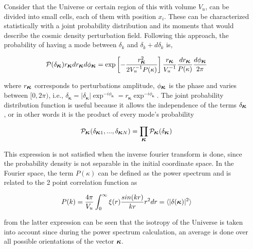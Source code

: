 Consider that the Universe or certain region of this with volume $V_u$, 
can be divided into small cells, each of them with position 
$x_i$. These can be characterized statistically with a joint probability 
distribution and its moments that would describe the 
cosmic density perturbation field. 
Following this approach, the probability of having a mode between $\delta_k$ and 
$\delta_{k}+d\delta_k$ is, 

\begin{equation}
\mathcal{P}(\delta_{\mbox{\boldmath$\kappa$}})r_{\mbox{\boldmath$\kappa$}}dr_{\mbox{\boldmath$\kappa$}}d\phi_{\mbox{\boldmath$\kappa$}}
=
\exp\left[-\frac{r_{\mbox{\boldmath$\kappa$}}^2}{2V_u^{-1}P(\kappa)}\right]	\frac{r_{\mbox{\boldmath$\kappa$}}}{V_u^{-1}}
\frac{dr_{\mbox{\boldmath$\kappa$}}}{P(\kappa)}\frac{d\phi_{\mbox{\boldmath$\kappa$}}}{2\pi}
\label{probabilidad}
\end{equation}


where $r_{\mbox{\boldmath$\kappa$}}$ corresponds to perturbations amplitude,  $\phi_{\mbox{\boldmath$\kappa$}}$ 
is the phase and varies between $[0,2\pi)$, i.e., $\delta_{\bm{\kappa}}=|\delta_{\bm{\kappa}}|\exp^{-i\phi_{\bm{\kappa}}} = r_{\bm{\kappa}} \exp^{-i\phi_{\bm\kappa}}$. The joint probability distribution function is useful because it allows the independence of the terms $\delta_{\mbox{\boldmath$\kappa$}}$, 
or in other words it is the product of every mode's probability

\[
\mathcal{P}_{\mbox{\boldmath$\kappa$}}(\delta_{\mbox{\boldmath$\kappa$}1},...,\delta_{\mbox{\boldmath$\kappa$}N})=
\prod_{\mbox{\boldmath$\kappa$}}\mathcal{P}_{\mbox{\boldmath$\kappa$}}(\delta_{\mbox{\boldmath$\kappa$}})
\]


This expression is not satisfied when the inverse fourier transform is done, since the 
probability density is not separable in the initial coordinate space. In the Fourier space,
the term $P(\kappa)$ can be defined as the power spectrum and is related to the 2 point correlation function as

\begin{equation}
P(k) = \frac{4\pi}{V_u}\int_0^\infty \xi (r)\frac{sin(kr)}{kr}r^2dr =  \langle|\delta(\mbox{\boldmath$\kappa$})|^2\rangle
\label{pk}
\end{equation}

from the latter expression can be seen that the isotropy of the Universe is taken into account since during the power spectrum calculation, an average is done over all  possible orientations of the vector ${\mbox{\boldmath$\kappa$}}$.


